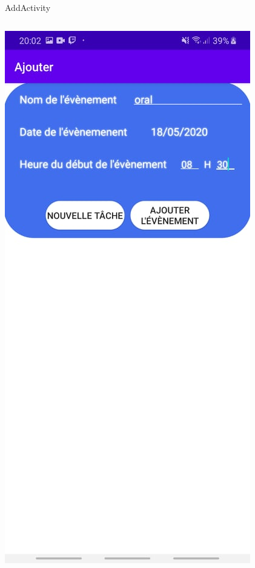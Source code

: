 \documentclass[11pt]{beamer}
\begin{document}
\begin{frame}{AddActivity}
\begin{columns}
\includegraphics[scale=0.4]{FormNoTask}


\end{columns}
\end{frame}
\end{document}
